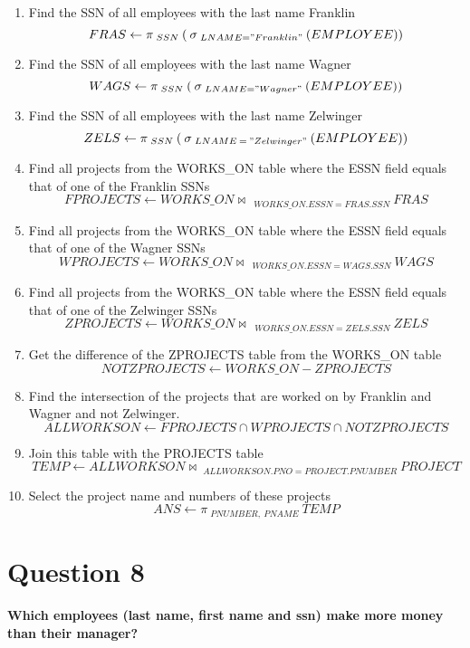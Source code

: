 \documentclass{article}
\begin{document}
    \begin{enumerate}
        \item Find the SSN of all employees with the last name Franklin
        \[ FRAS \gets \pi \: _{SSN} \: ( \: \sigma \: _{LNAME = "Franklin"} \: (EMPLOYEE)) \]
        \item Find the SSN of all employees with the last name Wagner
        \[ WAGS \gets \pi \: _{SSN} \: ( \: \sigma \: _{LNAME = "Wagner" } \: (EMPLOYEE)) \]
        \item Find the SSN of all employees with the last name Zelwinger
        \[ ZELS \gets \pi\:  _{SSN} \: ( \: \sigma \: _{LNAME \: = \: "Zelwinger"} \: (EMPLOYEE)) \]
        \item Find all projects from the WORKS\_ON table where the ESSN field equals that of one of the Franklin SSNs
        \[ FPROJECTS \gets WORKS\_ON \bowtie \: _{\: WORKS\_ON.ESSN = FRAS.SSN} \: FRAS \]
        \item Find all projects from the WORKS\_ON table where the ESSN field equals that of one of the Wagner SSNs
        \[ WPROJECTS \gets WORKS\_ON \bowtie \: _{\: WORKS\_ON.ESSN = WAGS.SSN} \: WAGS \]
        \item Find all projects from the WORKS\_ON table where the ESSN field equals that of one of the Zelwinger SSNs
        \[ ZPROJECTS \gets WORKS\_ON \bowtie \: _{\: WORKS\_ON.ESSN = ZELS.SSN} \: ZELS \]
        \item Get the difference of the ZPROJECTS table from the WORKS\_ON table
        \[ NOTZPROJECTS \gets WORKS\_ON - ZPROJECTS  \]
        \item Find the intersection of the projects that are worked on by Franklin and Wagner and not Zelwinger. 
        \[ ALLWORKSON \gets FPROJECTS \cap WPROJECTS \cap NOTZPROJECTS\]
        \item Join this table with the PROJECTS table
        \[ TEMP \gets ALLWORKSON \bowtie \: _{ALLWORKSON.PNO = PROJECT.PNUMBER} \: PROJECT\]
        \item Select the project name and numbers of these projects
        \[ ANS \gets \pi \: _{PNUMBER, \: PNAME} \: TEMP \]
        
    \end{enumerate}

\section{Question 8}

    \textbf{Which employees (last name, first name and ssn) make more money than their manager?}
    
\end{document}
